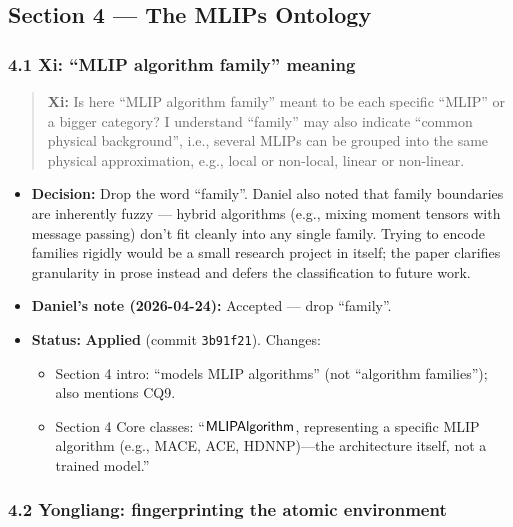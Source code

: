 \subsection{Section 4 --- The MLIPs Ontology}\label{section-4-the-mlips-ontology}

\subsubsection{4.1 Xi: ``MLIP algorithm family'' meaning}\label{xi-mlip-algorithm-family-meaning}

\begin{quote}
\textbf{Xi:} Is here ``MLIP algorithm family'' meant to be each specific ``MLIP'' or a bigger category? I understand ``family'' may also indicate ``common physical background'', i.e., several MLIPs can be grouped into the same physical approximation, e.g., local or non-local, linear or non-linear.
\end{quote}

\begin{itemize}
\tightlist
\item
  \textbf{Decision:} Drop the word ``family''. Daniel also noted that family boundaries are inherently fuzzy --- hybrid algorithms (e.g., mixing moment tensors with message passing) don't fit cleanly into any single family. Trying to encode families rigidly would be a small research project in itself; the paper clarifies granularity in prose instead and defers the classification to future work.
\item
  \textbf{Daniel's note (2026-04-24):} Accepted --- drop ``family''.
\item
  \textbf{Status:} {\color{green!60!black}\faCheckCircle} \textbf{Applied} (commit \texttt{3b91f21}). Changes:

  \begin{itemize}
  \tightlist
  \item
    Section 4 intro: ``models MLIP algorithms'' (not ``algorithm families''); also mentions CQ9.
  \item
    Section 4 Core classes: ``\(\mathsf{MLIPAlgorithm}\), representing a specific MLIP algorithm (e.g., MACE, ACE, HDNNP)---the architecture itself, not a trained model.''
  \end{itemize}
\end{itemize}

\subsubsection{4.2 Yongliang: fingerprinting the atomic environment}\label{yongliang-fingerprinting-the-atomic-environment}


